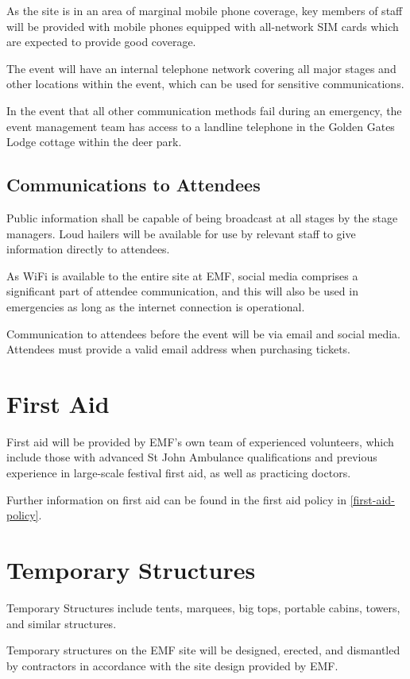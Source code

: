 As the site is in an area of marginal mobile phone coverage, key members of staff
will be provided with mobile phones equipped with all-network SIM cards which
are expected to provide good coverage.

The event will have an internal telephone network covering all major stages and
other locations within the event, which can be used for sensitive
communications.

In the event that all other communication methods fail during an emergency, the
event management team has access to a landline telephone in the Golden Gates
Lodge cottage within the deer park.

\subsection{Communications to Attendees}\label{attendeecomms}
Public information shall be capable of being broadcast at all stages by the
stage managers. Loud hailers will be available for use by relevant staff to
give information directly to attendees.

As WiFi is available to the entire site at EMF, social media comprises a
significant part of attendee communication, and this will also be used in
emergencies as long as the internet connection is operational.

Communication to attendees before the event will be via email and social
media. Attendees must provide a valid email address when purchasing tickets.

\section{First Aid}

First aid will be provided by EMF's own team of experienced volunteers,
which include those with advanced St John Ambulance qualifications and previous
experience in large-scale festival first aid, as well as practicing doctors.

Further information on first aid can be found in the first aid policy in
\cref{first-aid-policy}.

\section{Temporary Structures}
Temporary Structures include tents, marquees, big tops, portable cabins,
towers, and similar structures.

Temporary structures on the EMF site will be designed, erected, and dismantled
by contractors in accordance with the site design provided by EMF.

